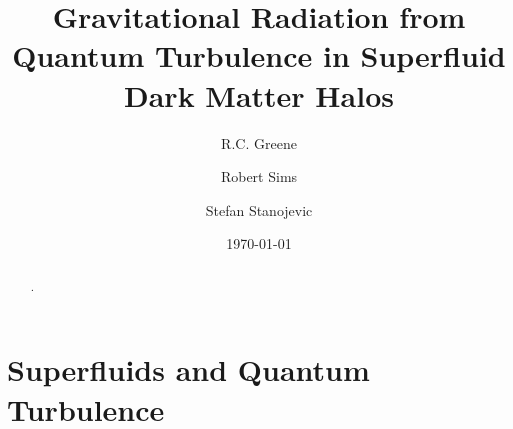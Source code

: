 \documentclass[onecolumn,nofootinbib,superscriptaddress]{revtex4}
\begin{document}
\title{Gravitational Radiation from Quantum Turbulence in Superfluid Dark Matter Halos}

\author{R.C. Greene}
\author{Robert Sims}
\author{Stefan Stanojevic}


\begin{abstract}
.
\end{abstract}


\date{\today}

\maketitle


\section{Superfluids and Quantum Turbulence}
\end{document}
